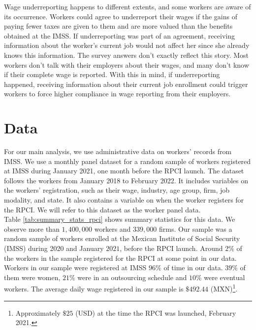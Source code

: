 \documentclass[10pt, oneside]{book}
\begin{document}
Wage underreporting happens to different extents, and some workers are aware of its occurrence. Workers could agree to underreport their wages if the gains of paying fewer taxes are given to them and are more valued than the benefits obtained at the IMSS. If underreporting was part of an agreement, receiving information about the worker's current job would not affect her since she already knows this information. The survey answers don't exactly reflect this story. Most workers don't talk with their employers about their wages, and many don't know if their complete wage is reported. With this in mind, if underreporting happened, receiving information about their current job enrollment could trigger workers to force higher compliance in wage reporting from their employers.



\chapter{Data} \label{data}

For our main analysis, we use administrative data on workers' records from IMSS. We use a monthly panel dataset for a random sample of workers registered at IMSS during January 2021, one month before the RPCI launch. The dataset follows the workers from January 2018 to February 2022. It includes variables on the workers' registration, such as their wage, industry, age group, firm, job modality, and state. It also contains a variable on when the worker registers for the RPCI. We will refer to this dataset as the worker panel data. \\ 

Table \ref{tab:summary_stats_rpci} shows summary statistics for this data. We observe more than $1,400,000$ workers and $339,000$ firms. Our sample was a random sample of workers enrolled at the Mexican Institute of Social Security (IMSS) during 2020 and January $2021$, before the RPCI launch. Around $2\%$ of the workers in the sample registered for the RPCI at some point in our data. Workers in our sample were registered at IMSS $96\%$ of time in our data. $39\%$ of them were women, $21\%$ were in an outsourcing schedule and $10\%$ were eventual workers. The average daily wage registered in our sample is $\$492.44$ (MXN)\footnote{Approximately $\$25$ (USD) at the time the RPCI was launched, February 2021.}. \\
\end{document}
